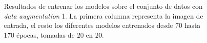 \begin{figure}[H]
\centering
    \caption{Resultados de entrenar los modelos sobre el conjunto de datos con \textit{data augmentation} 1. La primera columna representa la imagen de entrada, el resto los diferentes modelos entrenados desde 70 hasta 170 épocas, tomadas de 20 en 20.} 
    \label{fig:synthetic_molecules_aug1}
\end{figure}

